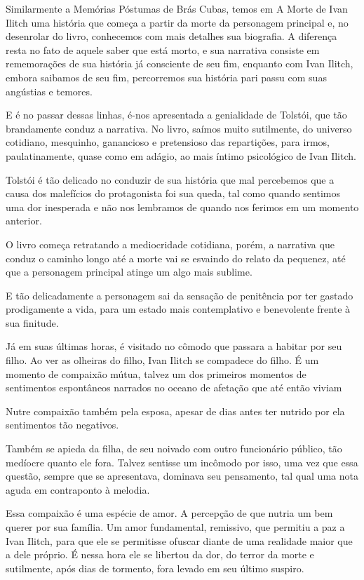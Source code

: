 \documentclass[12pt]{extarticle}
\begin{document}
Similarmente a Memórias Póstumas de Brás Cubas, temos em A Morte de Ivan
Ilitch uma história que começa a partir da morte da personagem principal
e, no desenrolar do livro, conhecemos com mais detalhes sua biografia. A
diferença resta no fato de aquele saber que está morto, e sua narrativa
consiste em rememorações de sua história já consciente de seu fim,
enquanto com Ivan Ilitch, embora saibamos de seu fim, percorremos sua
história pari passu com suas angústias e temores.

E é no passar dessas linhas, é-nos apresentada a genialidade de Tolstói,
que tão brandamente conduz a narrativa. No livro, saímos muito
sutilmente, do universo cotidiano, mesquinho, ganancioso e pretensioso
das repartições, para irmos, paulatinamente, quase como em adágio, ao
mais íntimo psicológico de Ivan Ilitch.

Tolstói é tão delicado no conduzir de sua história que mal percebemos
que a causa dos malefícios do protagonista foi sua queda, tal como
quando sentimos uma dor inesperada e não nos lembramos de quando nos
ferimos em um momento anterior.

O livro começa retratando a mediocridade cotidiana, porém, a narrativa
que conduz o caminho longo até a morte vai se esvaindo do relato da
pequenez, até que a personagem principal atinge um algo mais sublime.

E tão delicadamente a personagem sai da sensação de penitência por ter
gastado prodigamente a vida, para um estado mais contemplativo e
benevolente frente à sua finitude.

Já em suas últimas horas, é visitado no cômodo que passara a habitar por
seu filho. Ao ver as olheiras do filho, Ivan Ilitch se compadece do
filho. É um momento de compaixão mútua, talvez um dos primeiros momentos
de sentimentos espontâneos narrados no oceano de afetação que até então
viviam

Nutre compaixão também pela esposa, apesar de dias antes ter nutrido por
ela sentimentos tão negativos.

Também se apieda da filha, de seu noivado com outro funcionário público,
tão medíocre quanto ele fora. Talvez sentisse um incômodo por isso, uma
vez que essa questão, sempre que se apresentava, dominava seu
pensamento, tal qual uma nota aguda em contraponto à melodia.

Essa compaixão é uma espécie de amor. A percepção de que nutria um bem
querer por sua família. Um amor fundamental, remissivo, que permitiu a
paz a Ivan Ilitch, para que ele se permitisse ofuscar diante de uma
realidade maior que a dele próprio. É nessa hora ele se libertou da dor,
do terror da morte e sutilmente, após dias de tormento, fora levado em
seu último suspiro.
\end{document}
